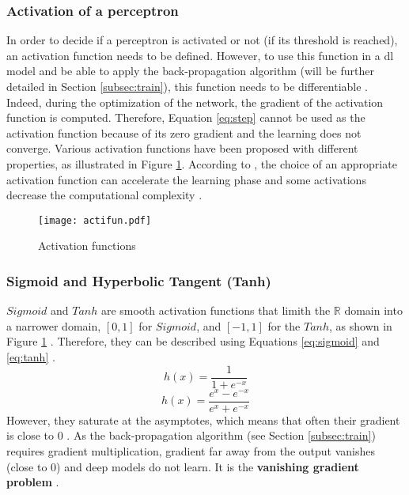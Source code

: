 \subsubsection{Activation of a perceptron} \label{subs:acti}
In order to decide if a perceptron is activated or not (if its threshold is reached), an activation function needs to be defined. However, to use this function in a \acrshort{dl} model and be able to apply the back-propagation algorithm (will be further detailed in Section \ref{subsec:train}), this function needs to be differentiable \cite{lecun_backpropagation_1989}. Indeed, during the optimization of the network, the gradient of the activation function is computed. Therefore, Equation \ref{eq:step} cannot be used as the activation function because of its zero gradient and the learning does not converge.  Various activation functions have been proposed with different properties, as illustrated in Figure \ref{fig:acti}. According to \textcite{khan_survey_2020}, the choice of an appropriate activation function can accelerate the learning phase and some activations decrease the computational complexity \cite{krizhevsky_imagenet_2012}.
%
\begin{figure}[H]
    \centering
    \texttt{[image: actifun.pdf]}
    \caption{Activation functions}
    \label{fig:acti}
\end{figure}
%
\subsubsection{Sigmoid and Hyperbolic Tangent (Tanh)}
$Sigmoid$ and $Tanh$ are smooth activation functions that limith the $\mathbb{R}$ domain into a narrower domain, $[0, 1]$ for $Sigmoid$, and $[-1, 1]$ for the $Tanh$, as shown in Figure \ref{fig:acti} \cite{matteucci_artificial_2019}. Therefore, they can be described using Equations \eqref{eq:sigmoid} and \eqref{eq:tanh} \cite{krizhevsky_imagenet_2012}.
%
\begin{equation}
    h(x) = \frac{1}{1 + e^{-x}}
    \label{eq:sigmoid}
\end{equation}
%
\begin{equation}
    h(x) = \frac{e^{x} - e^{-x}}{e^{x} + e^{-x}}
    \label{eq:tanh}
\end{equation}
%
However, they saturate at the asymptotes, which means that often their gradient is close to 0 \cite{glorot_understanding_2010}. As the back-propagation algorithm (see Section \ref{subsec:train}) requires gradient multiplication, gradient far away from the output vanishes (close to 0) and deep models do not learn. It is the \textbf{vanishing gradient problem} \cite{khan_survey_2020, goodfellow_deep_2016, matteucci_artificial_2019, maas_rectier_2013}.
%
